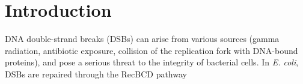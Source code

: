 \section*{Introduction}

DNA double-strand breaks (DSBs) can arise from various sources (gamma radiation, antibiotic exposure, collision of the replication fork with DNA-bound proteins), and pose a serious threat to the integrity of bacterial cells. In \emph{E. coli}, DSBs are repaired through the RecBCD pathway











